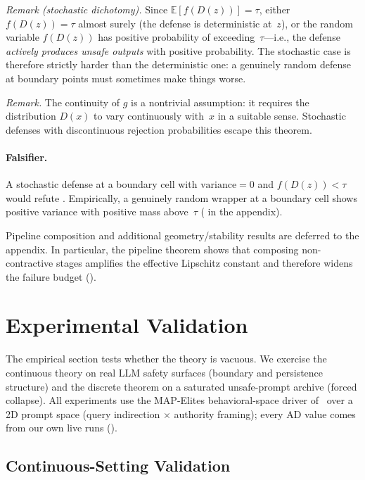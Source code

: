 \documentclass[11pt]{article}
\begin{document}
\noindent\textit{Remark (stochastic dichotomy).}
Since $\mathbb{E}[f(D(z))] = \tau$, either $f(D(z)) = \tau$ almost
surely (the defense is deterministic at~$z$), or the random variable
$f(D(z))$ has positive probability of exceeding~$\tau$---i.e., the
defense \emph{actively produces unsafe outputs} with positive
probability. The stochastic case is therefore strictly harder than
the deterministic one: a genuinely random defense at boundary points
must sometimes make things worse.

\noindent\textit{Remark.}
The continuity of $g$ is a nontrivial assumption: it requires the
distribution $D(x)$ to vary continuously with~$x$ in a suitable sense.
Stochastic defenses with discontinuous rejection probabilities escape
this theorem.

\paragraph{Falsifier.}
A stochastic defense at a boundary cell with $\mathrm{variance} = 0$
and $f(D(z)) < \tau$ would refute .
Empirically, a genuinely random wrapper at a boundary cell shows positive variance with positive mass above~$\tau$ ( in the appendix).

Pipeline composition and additional geometry/stability results are
deferred to the appendix. In particular, the pipeline theorem shows
that composing non-contractive stages amplifies the effective
Lipschitz constant and therefore widens the failure budget
().


\section{Experimental Validation}
\label{sec:experiments}

The empirical section tests whether the theory is vacuous.
We exercise the continuous theory on real LLM safety surfaces (boundary and persistence structure) and the discrete theorem on a saturated unsafe-prompt archive (forced collapse).
All experiments use the MAP-Elites behavioral-space driver of~\cite{munshi2026manifold} over a 2D prompt space (query indirection $\times$ authority framing); every AD value comes from our own live runs ().

\subsection{Continuous-Setting Validation}
\label{sec:live-validation}
\end{document}
